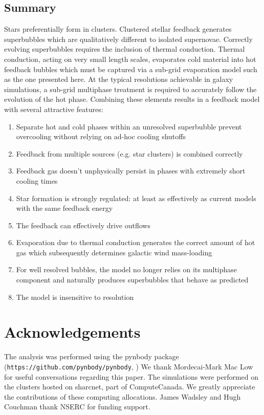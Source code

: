 \subsection{Summary}
Stars preferentially form in clusters.  Clustered stellar feedback generates
superbubbles which are qualitatively different to isolated supernovae.
Correctly evolving superbubbles requires the inclusion of thermal conduction.
Thermal conduction, acting on very small length scales, evaporates cold material
into hot feedback bubbles which must be captured via a sub-grid evaporation
model such as the one presented here.  At the typical resolutions achievable in
galaxy simulations, a sub-grid multiphase treatment is required to accurately
follow the evolution of the hot phase.  Combining these elements results in a
feedback model with several attractive features:

\begin{enumerate}
    \item Separate hot and cold phases within an unresolved superbubble prevent overcooling
        without relying on ad-hoc cooling shutoffs
    \item Feedback from multiple sources (e.g. star clusters) is combined correctly
    \item Feedback gas doesn't unphysically persist in phases with extremely short cooling times
    \item Star formation is strongly regulated: at least as effectively as current models with the same
           feedback energy
    \item The feedback can effectively drive outflows
    \item Evaporation due to thermal conduction
        generates the correct amount of hot gas which 
        subsequently determines galactic wind mass-loading
    \item For well resolved bubbles, the model no longer relies on its multiphase component 
         and naturally produces superbubbles that behave as predicted
    \item The model is insensitive to resolution
\end{enumerate}

\section*{Acknowledgements}
The analysis was performed using the pynbody package
(\texttt{https://github.com/pynbody/pynbody}, \citep{pynbody})
  We thank Mordecai-Mark Mac Low for useful
conversations regarding this paper.  The simulations were performed on the
clusters hosted on {\sc sharcnet}, part of ComputeCanada.  We greatly
appreciate the contributions of these computing allocations. James Wadsley and
Hugh Couchman thank NSERC for funding support.


